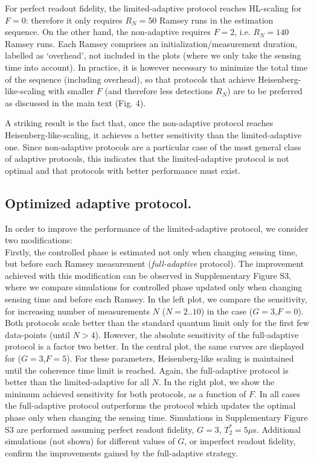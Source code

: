 \documentclass{report}
\begin{document}
For perfect readout fidelity, the limited-adaptive protocol reaches HL-scaling for $F=0$: therefore it only requires $R_N = 50$ Ramsey runs in the estimation sequence. On the other hand, the non-adaptive requires $F=2$, i.e. $R_N = 140$ Ramsey runs. Each Ramsey comprises an initialization/measurement duration, labelled as `overhead', not included in the plots (where we only take the sensing time into account). In practice, it is however necessary to minimize the total time of the sequence (including overhead), so that protocols that achieve Heisenberg-like-scaling with smaller $F$ (and therefore less detections $R_N$) are to be preferred as discussed in the main text (Fig. 4).


A striking result is the fact that, once the non-adaptive protocol reaches Heisenberg-like-scaling, it achieves a better sensitivity than the limited-adaptive one. Since non-adaptive protocols are a particular case of the most general class of adaptive protocols, this indicates that the limited-adaptive protocol is not optimal and that protocols with better performance must exist.

\subsection{Optimized adaptive protocol. }

In order to improve the performance of the limited-adaptive protocol, we consider two modifications:\\

Firstly, the controlled phase is estimated not only when changing sensing time, but before each Ramsey measurement (\textit{full-adaptive} protocol). The improvement achieved with this modification can be observed in Supplementary Figure S3, where we compare simulations for controlled phase updated only when changing sensing time and before each Ramsey. In the left plot, we compare the sensitivity, for increasing number of measurements $N$ ($N=2..10$) in the case ($G=3$,$F=0$). Both protocols scale better than the standard quantum limit only for the first few data-points (until $N>4$). However, the absolute sensitivity of the full-adaptive protocol is a factor two better. In the central plot, the same curves are displayed for ($G=3$,$F=5$). For these parameters, Heisenberg-like scaling is maintained until the coherence time limit is reached. Again, the full-adaptive protocol is better than the limited-adaptive for all $N$. In the right plot, we show the minimum achieved sensitivity for both protocols, as a function of $F$. In all cases the full-adaptive protocol outperforms the protocol which updates the optimal phase only when changing the sensing time. Simulations in Supplementary Figure S3 are performed assuming perfect readout fidelity, $G=3$, $T_2^* = 5 \mu$s.   Additional simulations (not shown) for different values of $G$, or imperfect readout fidelity, confirm the improvements gained by the full-adaptive strategy. \\
\end{document}
